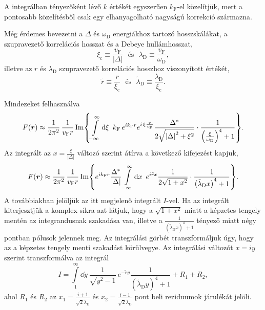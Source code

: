 \documentclass[a4paper,12pt,titlepage]{article}
\newcommand{\RR}{{\vb*{r}}}
\newcommand{\kF}{{k_\text{F}}}
\newcommand{\vF}{{v_\text{F}}}
\newcommand{\xic}{{\xi_\text{c}}}
\begin{document}
A integrálban tényezőként lévő $k$ értékét egyszerűen $\kF$-el közelítjük, mert a pontosabb közelítésből csak egy elhanyagolható nagyságú korrekció származna.

Még érdemes bevezetni a $\Delta$ és $\omega_\text{D}$ energiákhoz tartozó hosszskálákat, a szupravezető korrelációs hosszat és a Debeye hullámhosszat,
\begin{equation}
	\xic \equiv \frac{\vF}{\left| \Delta \right|} ~~~ \text{és} ~~~ \lambda_\text{D} \equiv \frac{\vF}{\omega_\text{D}},
\end{equation}
illetve az $r$ és $\lambda_\text{D}$ szupravezető korrelációs hosszhoz viszonyított értékét,
\begin{equation}
	\tilde{r} \equiv \frac{r}{\xic} ~~~ \text{és} ~~~ \tilde{\lambda}_\text{D} \equiv \frac{\lambda_\text{D}}{\xic}.
\end{equation}

Mindezeket felhasználva
\begin{equation}
	F(\RR) \approx \frac{1}{2 \pi^2} \, \frac{1}{\vF r} \Im{ \int\limits_{-\infty}^\infty \dd{\xi} ~ \kF \, e^{i \kF r} e^{i \, \xi \frac{r}{\vF}} \frac{\Delta^*}{2 \sqrt{\left| \Delta \right|^2 + \xi^2}} \cdot \frac{1}{\left( \frac{\xi}{\omega_\text{D}} \right)^4 + 1} }.
\end{equation}
Az integrált az $x = \frac{\xi}{\left| \Delta \right|}$ változó szerint átírva a következő kifejezést kapjuk,
\begin{equation} \label{f-def}
	F(\RR) \approx \frac{1}{2 \pi^2} \, \frac{1}{\vF r} \Im{ e^{i \kF r} \frac{\Delta^*}{\left| \Delta \right|} \int\limits_{-\infty}^\infty \dd{x} ~ e^{i \tilde{r} x} \frac{1}{2 \sqrt{1 + x^2}} \cdot \frac{1}{\left( \tilde{\lambda}_\text{D} x \right)^4 + 1} }.
\end{equation}
A továbbiakban jelöljük az itt megjelenő integrált $I$-vel.  Ha az integrált kiterjesztjük a komplex síkra azt látjuk, hogy a $\sqrt{1 + x^2}$ miatt a képzetes tengely mentén az integrandusnak szakadása van, illetve a $\frac{1}{\left( \tilde{\lambda}_\text{D} x \right)^4 + 1}$ tényező miatt négy pontban pólusok jelennek meg.  Az integrálási görbét transzformáljuk úgy, hogy az a képzetes tengely menti szakadást körülvegye.  Az integrálási változót $x = i y$ szerint transzformálva az integrál
\begin{equation}
	I = \int\limits_1^\infty \dd{y} ~ \frac{1}{\sqrt{y^2 - 1}} \, e^{-\tilde{r} y} \frac{1}{\left( \tilde{\lambda}_\text{D} y \right)^4 + 1} + R_1 + R_2,
\end{equation}
ahol $R_1$ és $R_2$ az $x_1 = \frac{i + 1}{\sqrt{2} \tilde{\lambda}_\text{D}}$ és $x_2 = \frac{i - 1}{\sqrt{2} \tilde{\lambda}_\text{D}}$ pont beli reziduumok járulékát jelöli.
\end{document}
